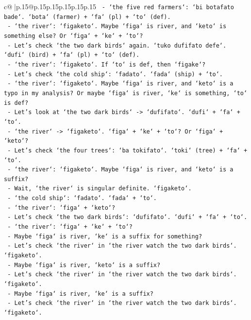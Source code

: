 \documentclass{article}
\begin{document}
{\begin{supertabular}{c@{$\;$}|p{.15\linewidth}@{}p{.15\linewidth}p{.15\linewidth}p{.15\linewidth}p{.15\linewidth}p{.15\linewidth}}
{{{\texttt{     {-} `the five red farmers`: `bi botafato bade`. `bota` (farmer) + `fa` (pl) + `to` (def).} \\
\texttt{     {-} `the river`: `figaketo`. Maybe `figa` is river, and `keto` is something else? Or `figa` + `ke` + `to`?} \\
\texttt{     {-} Let's check `the two dark birds` again. `tuko dufifato defe`. `dufi` (bird) + `fa` (pl) + `to` (def).} \\
\texttt{     {-} `the river`: `figaketo`. If `to` is def, then `figake`?} \\
\texttt{     {-} Let's check `the cold ship`: `fadato`. `fada` (ship) + `to`.} \\
\texttt{     {-} `the river`: `figaketo`. Maybe `figa` is river, and `keto` is a typo in my analysis? Or maybe `figa` is river, `ke` is something, `to` is def?} \\
\texttt{     {-} Let's look at `the two dark birds` {-}> `dufifato`. `dufi` + `fa` + `to`.} \\
\texttt{     {-} `the river` {-}> `figaketo`. `figa` + `ke` + `to`? Or `figa` + `keto`?} \\
\texttt{     {-} Let's check `the four trees`: `ba tokifato`. `toki` (tree) + `fa` + `to`.} \\
\texttt{     {-} `the river`: `figaketo`. Maybe `figa` is river, and `keto` is a suffix?} \\
\texttt{     {-} Wait, `the river` is singular definite. `figaketo`.} \\
\texttt{     {-} `the cold ship`: `fadato`. `fada` + `to`.} \\
\texttt{     {-} `the river`: `figa` + `keto`?} \\
\texttt{     {-} Let's check `the two dark birds`: `dufifato`. `dufi` + `fa` + `to`.} \\
\texttt{     {-} `the river`: `figa` + `ke` + `to`?} \\
\texttt{     {-} Maybe `figa` is river, `ke` is a suffix for something?} \\
\texttt{     {-} Let's check `the river` in `the river watch the two dark birds`. `figaketo`.} \\
\texttt{     {-} Maybe `figa` is river, `keto` is a suffix?} \\
\texttt{     {-} Let's check `the river` in `the river watch the two dark birds`. `figaketo`.} \\
\texttt{     {-} Maybe `figa` is river, `ke` is a suffix?} \\
\texttt{     {-} Let's check `the river` in `the river watch the two dark birds`. `figaketo`.} \\
}}}
\end{supertabular}}
\end{document}
